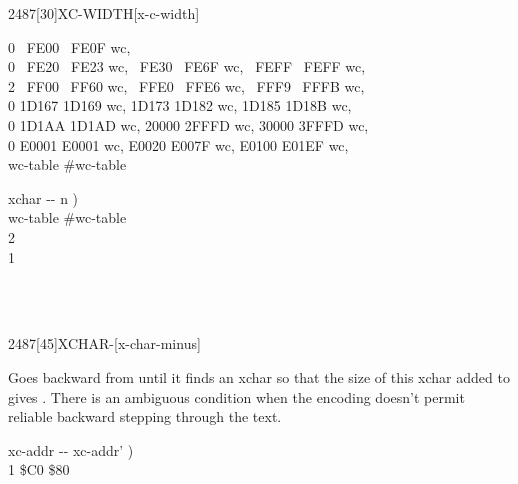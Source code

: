 \begin{worddef}{2487}[30]{XC-WIDTH}[x-c-width]
\begin{implement}
	0 ~FE00 ~FE0F wc,\\
	0 ~FE20 ~FE23 wc, ~FE30 ~FE6F wc, ~FEFF ~FEFF wc,\\
	2 ~FF00 ~FF60 wc, ~FFE0 ~FFE6 wc, ~FFF9 ~FFFB wc,\\
	0 1D167 1D169 wc, 1D173 1D182 wc, 1D185 1D18B wc,\\
	0 1D1AA 1D1AD wc, 20000 2FFFD wc, 30000 3FFFD wc,\\
	0 E0001 E0001 wc, E0020 E007F wc, E0100 E01EF wc,\\
	 wc-table \word{-}  \#wc-table

	 

	\word{:}   xchar -{}- n ) \\
	\tab wc-table \#wc-table  \word{+}   \\
	\tab[2]     
		  2  \word{+}     \\
	    1 \word{;}
	\end{implement}

	\begin{testing} %
		 \\
		 \\
	\end{testing}
\end{worddef}


\begin{worddef}{2487}[45]{XCHAR-}[x-char-minus]%
\item {}

	Goes backward from  until it finds an xchar so that the
	size of this xchar added to  gives .
	There is an ambiguous condition when the encoding doesn't permit reliable
	backward stepping through the text.

	\begin{implement} %
	\word{:}   xc-addr -{}- xc-addr' ) \\
	\tab {}  1  \word{-}   \$C0  \$80   \word{;}
	\end{implement}
\end{worddef}


